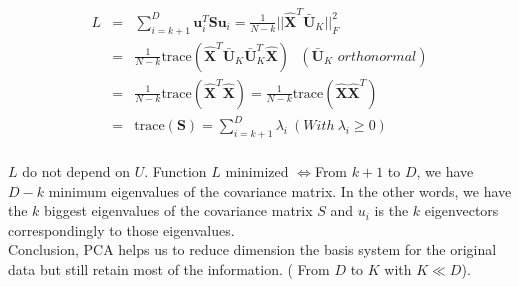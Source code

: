 \documentclass[a4paper, 12pt]{report}
\begin{document}
\begin{eqnarray*}
    L&=&\sum_{i=k+1}^D \mathbf{u}_i^T\mathbf{Su}_i = \frac{1}{N-k} ||\hat{\mathbf{X}}^T\bar{\mathbf{U}}_K||_F^2\\
    &=& \frac{1}{N-k} \text{trace}(\hat{\mathbf{X}}^T\bar{\mathbf{U}}_K \bar{\mathbf{U}}_K^T \hat{\mathbf{X}})~~~(\bar{\mathbf{U}}_K\,\, orthonormal) \\ 
    &=& \frac{1}{N-k} \text{trace} (\hat{\mathbf{X}}^T \hat{\mathbf{X}})= \frac{1}{N-k} \text{trace} (\hat{\mathbf{X}} \hat{\mathbf{X}}^T) \\ 
    &=& \text{trace} (\mathbf{S}) = \sum_{i=k+1}^D \lambda_i~ (With ~\lambda_i \geq 0)\\
\end{eqnarray*}
\indent \par $L$ do not depend on $U$. Function $L$ minimized $\Leftrightarrow$From $k+1$ to $D$, we have $D-k$ minimum eigenvalues of the covariance matrix. In the other words, we have the $k$ biggest eigenvalues of the covariance matrix $S$ and $u_i$ is the $k$ eigenvectors correspondingly to those eigenvalues.\\
Conclusion, PCA helps us to reduce dimension the basis system for the original data but still retain most of the information. ( From $D$ to $K$ with $K \ll D$).
\end{document}

